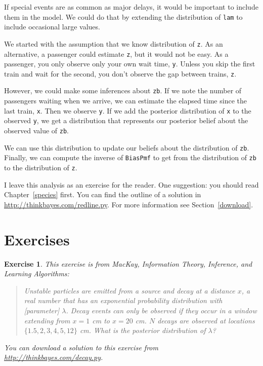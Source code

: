 \documentclass[12pt]{book}
\theoremstyle{exercise}
\newtheorem{exercise}{Exercise}[chapter]
\begin{document}
If special events are as common as major delays, it would
be important to include them in the model.  We could do that by
extending the distribution of {\tt lam} to include occasional
large values.

We started with the assumption that we know
distribution of {\tt z}.
As an alternative, a passenger could estimate {\tt z}, but it would
not be easy.
As a passenger, you only
observe only your own wait time, {\tt y}.  Unless you skip
the first train and wait for the second, you don't
observe the gap between trains, {\tt z}.

However, we could make some inferences about {\tt zb}.  If we note
the number of passengers waiting when we arrive, we can estimate
the elapsed time since the last train, {\tt x}.  Then we observe
{\tt y}.  If we add the posterior distribution of {\tt x} to
the observed {\tt y}, we get a distribution that represents
our posterior belief about the observed value of {\tt zb}.

We can use this distribution to update our beliefs about the
distribution of {\tt zb}.  Finally, we can compute the
inverse of {\tt BiasPmf} to get from the distribution of {\tt zb}
to the distribution of {\tt z}.

I leave this analysis as an exercise for the
reader.  One suggestion: you should read Chapter~\ref{species} first.
You can find the outline of
a solution in \url{http://thinkbayes.com/redline.py}.
  For more information
see Section~\ref{download}.

\section{Exercises}

\begin{exercise}
This exercise is from
MacKay, {\em Information Theory, Inference, and Learning Algorithms}:

\begin{quote}
    Unstable particles are emitted from a source and decay at a
distance $x$, a real number that has an exponential probability
distribution with [parameter] $\lambda$.  Decay events can only be
observed if they occur in a window extending from $x=1$ cm to $x=20$
cm.  $N$ decays are observed at locations $\{ 1.5, 2, 3, 4, 5, 12 \}$
cm.  What is the posterior distribution of $\lambda$?

\end{quote}

You can download a solution to this exercise from
\url{http://thinkbayes.com/decay.py}.

\end{exercise}
\end{document}
